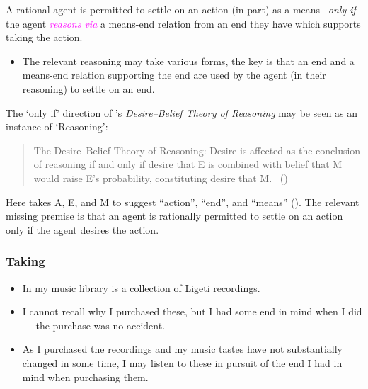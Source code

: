 \documentclass[10pt]{article}
\newenvironment{beamerblock}[1]{%
  \tcolorbox[standard,%
  no shadow,
  noparskip,
  colback=white,
  colframe=black,
  colbacktitle=white,
  coltitle=black,
  colupper=black,
  size=small,
  boxrule=.125mm,
  fonttitle=\bfseries,
  sharp corners=all,
  title=#1]}%
{\endtcolorbox}
\newcommand{\hozlinedash}[0]{%
  \noindent\hdashrule[0.5ex][c]{\textwidth}{.1pt}{2.5pt}
}
\begin{document}
\begin{beamerblock}{Reasoning}
  A rational agent is permitted to settle on an action (in part) as a means
  \newline
  \mbox{ }\hfill\emph{only if}\hfill\mbox{ }
  \newline
  the agent \textcolor{fuchsia}{\emph{reasons via}} a means-end relation from an end they have which supports taking the action.
\end{beamerblock}

\begin{itemize}
\item The relevant reasoning may take various forms, the key is that an end and a means-end relation supporting the end are used by the agent (in their reasoning) to settle on an end.
\end{itemize}




The `only if' direction of \citeauthor{Sinhababu:2017aa}'s \emph{Desire–Belief Theory of Reasoning} may be seen as an instance of `Reasoning':

\begin{quote}
  The Desire–Belief Theory of Reasoning: Desire is affected as the conclusion of reasoning if and only if desire that E is combined with belief that M would raise E’s probability, constituting desire that M.\nolinebreak
  \mbox{ }\hfill\mbox{(\citeyear[2,39]{Sinhababu:2017aa})}
\end{quote}
Here \citeauthor{Sinhababu:2017aa} takes A, E, and M to suggest ``action'', ``end'', and ``means'' (\citeyear[2]{Sinhababu:2017aa}).
The relevant missing premise is that an agent is rationally permitted to settle on an action only if the agent desires the action.


\hozlinedash

\subsubsection{Taking}
\label{sec:taking}

\begin{itemize}
\item In my music library is a collection of Ligeti recordings.
\item I cannot recall why I purchased these, but I had some end in mind when I did --- the purchase was no accident.
\item As I purchased the recordings and my music tastes have not substantially changed in some time, I may listen to these in pursuit of the end I had in mind when purchasing them.
\end{itemize}
\end{document}
